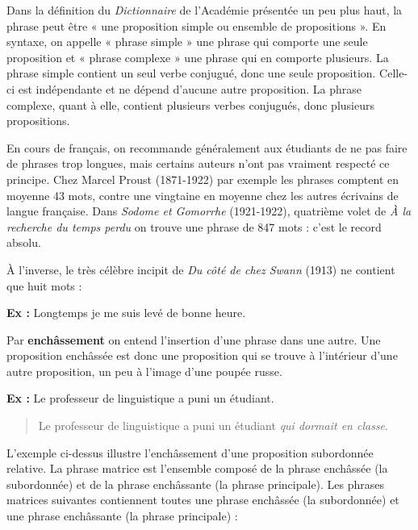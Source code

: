 Dans la définition du \textit{Dictionnaire} de l’Académie présentée un peu plus haut, la phrase peut être « une proposition simple ou ensemble de propositions ». En syntaxe, on appelle « phrase simple » une phrase qui comporte une seule proposition et « phrase complexe » une phrase qui en comporte plusieurs. La phrase simple contient un seul verbe conjugué, donc une seule proposition. Celle-ci est indépendante et ne dépend d’aucune autre proposition. La phrase complexe, quant à elle, contient plusieurs verbes conjugués, donc plusieurs propositions.

En cours de français, on recommande généralement aux étudiants de ne pas faire de phrases trop longues, mais certains auteurs n’ont pas vraiment respecté ce principe. Chez Marcel Proust (1871-1922) par exemple les phrases comptent en moyenne 43 mots, contre une vingtaine en moyenne chez les autres écrivains de langue française. Dans \textit{Sodome et Gomorrhe} (1921-1922), quatrième volet de \textit{À la recherche du temps perdu} on trouve une phrase de 847 mots : c’est le record absolu.

À l’inverse, le très célèbre incipit de \textit{Du côté de chez Swann} (1913) ne contient que huit mots :

\noindent\textbf{Ex :} Longtemps je me suis levé de bonne heure.

Par \textbf{enchâssement} on entend l’insertion d’une phrase dans une autre. Une proposition enchâssée est donc une proposition qui se trouve à l’intérieur d’une autre proposition, un peu à l’image d’une poupée russe.

\noindent\textbf{Ex :} Le professeur de linguistique a puni un étudiant.
\begin{quote}
Le professeur de linguistique a puni un étudiant \textit{qui dormait en classe}.
\end{quote}
L’exemple ci-dessus illustre l’enchâssement d’une proposition subordonnée relative. La phrase matrice est l’ensemble composé de la phrase enchâssée (la subordonnée) et de la phrase enchâssante (la phrase principale). Les phrases matrices suivantes contiennent toutes une phrase enchâssée (la subordonnée) et une phrase enchâssante (la phrase principale) :

